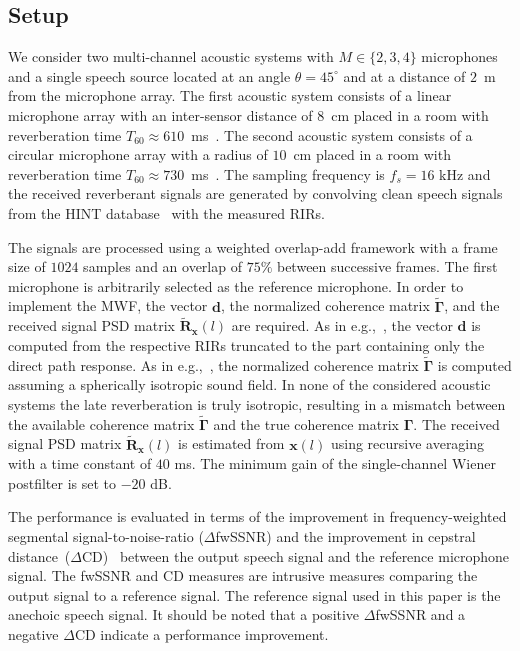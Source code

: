 \documentclass{article}
\begin{document}
\subsection{Setup}
We consider two multi-channel acoustic systems with $M \in \{2, 3, 4 \}$ microphones and a single speech source located at an angle $\theta = 45^{\circ}$ and at a distance of $2$~m from the microphone array.
The first acoustic system consists of a linear microphone array with an inter-sensor distance of $8$~cm placed in a room with reverberation time $T_{60} \approx 610$~ms~\cite{hadad_IWAENC_2014}.
The second acoustic system consists of a circular microphone array with a radius of $10$~cm placed in a room with reverberation time $T_{60} \approx 730$~ms~\cite{REVERB2016}.
The sampling frequency is $f_s = 16$ kHz and the received reverberant signals are generated by convolving clean speech signals from the HINT database~\cite{Nilsson_JASA_1994} with the measured RIRs. 

The signals are processed using a weighted overlap-add framework with a frame size of $1024$ samples and an overlap of $75 \%$ between successive frames. 
The first microphone is arbitrarily selected as the reference microphone.
In order to implement the MWF, the vector $\mathbf{d}$, the normalized coherence matrix $\tilde{\boldsymbol{\Gamma}}$, and the received signal PSD matrix $\tilde{\mathbf{R}}_{\mathbf{x}}(l)$ are required.
As in e.g.,~\cite{Kuklasinski_EUSIPCO_2014g,Kuklasinksi_ICASSP_2015,kuklasinski_AES_2016}, the vector $\mathbf{d}$ is computed from the respective RIRs truncated to the part containing only the direct path response.
As in e.g.,~\cite{Braun_EUSIPCO_2013,Braun_EURASIP_2015}, the normalized coherence matrix $\tilde{\boldsymbol{\Gamma}}$ is computed assuming a spherically isotropic sound field. %
In none of the considered acoustic systems the late reverberation is truly isotropic, resulting in a mismatch between the available coherence matrix $\tilde{\boldsymbol{\Gamma}}$ and the true coherence matrix $\boldsymbol{\Gamma}$.
The received signal PSD matrix $\tilde{\mathbf{R}}_{\mathbf{x}}(l)$ is estimated from $\mathbf{x}(l)$ using recursive averaging with a time constant of $40$ ms.
The minimum gain of the single-channel Wiener postfilter is set to $-20$ dB.

The performance is evaluated in terms of the improvement in frequency-weighted segmental signal-to-noise-ratio ($\Delta$fwSSNR) \cite{Hu_ITASLP_2008} and the improvement in cepstral distance~($\Delta$CD)~\cite{Quackenbush_book} between the output speech signal and the reference microphone signal.
The fwSSNR and CD measures are intrusive measures comparing the output signal to a reference signal. 
The reference signal used in this paper is the anechoic speech signal.
It should be noted that a positive $\Delta$fwSSNR and a negative $\Delta$CD indicate a performance improvement.
\end{document}

